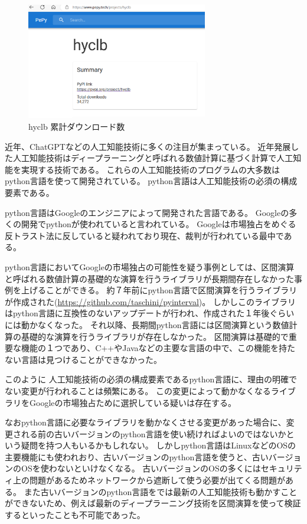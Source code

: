\documentclass[11pt,a4j,dvipdfmx]{jarticle} 					%
\newcommand{\研究課題名}{人工知能のためのLispシステム}
\newcommand{\研究機関名}{大阪公立大学工業高等専門学校}
\newcommand{\研究代表者氏名}{新妻弘崇}
\newcommand{\研究期間の最終元号年度}{11}  %
\begin{document}


\begin{figure}[htbp]
\begin{minipage}{0.5\hsize}
  \centering
  \includegraphics[width=7.9cm]{hyclb-ndown.eps}
  \caption{hyclb 累計ダウンロード数 }
  \label{fig:hyclb-ndown}
 \end{minipage}
\end{figure}


近年、ChatGPTなどの人工知能技術に多くの注目が集まっている。
近年発展した人工知能技術はディープラーニングと呼ばれる数値計算に基づく計算で人工知能を実現する技術である。
これらの人工知能技術のプログラムの大多数はpython言語を使って開発されている。
python言語は人工知能技術の必須の構成要素である。

python言語はGoogleのエンジニアによって開発された言語である。
Googleの多くの開発でpythonが使われていると言われている。
Googleは市場独占をめぐる反トラスト法に反していると疑われており現在、裁判が行われている最中である。

python言語においてGoogleの市場独占の可能性を疑う事例としては、区間演算と呼ばれる数値計算の基礎的な演算を行うライブラリが長期間存在しなかった事例を上げることができる。
約７年前にpython言語で区間演算を行うライブラリが作成された(\url{https://github.com/taschini/pyinterval})。
しかしこのライブラリはpython言語に互換性のないアップデートが行われ、作成された１年後ぐらいには動かなくなった。
それ以降、長期間python言語には区間演算という数値計算の基礎的な演算を行うライブラリが存在しなかった。
区間演算は基礎的で重要な機能の１つであり、C++やJavaなどの主要な言語の中で、この機能を持たない言語は見つけることができなかった。

このように
人工知能技術の必須の構成要素であるpython言語に、理由の明確でない変更が行われることは頻繁にある。
この変更によって動かなくなるライブラリをGoogleの市場独占ために選択している疑いは存在する。

なおpython言語に必要なライブラリを動かなくさせる変更があった場合に、変更される前の古いバージョンのpython言語を使い続ければよいのではないかという疑問を持つ人もいるかもしれない。
しかしpython言語はLinuxなどのOSの主要機能にも使われおり、古いバージョンのpython言語を使うと、古いバージョンのOSを使わないといけなくなる。
古いバージョンのOSの多くにはセキュリティ上の問題があるためネットワークから遮断して使う必要が出てくる問題がある。
また古いバージョンのpython言語をでは最新の人工知能技術も動かすことができないため、例えば最新のディープラーニング技術を区間演算を使って検証するといったことも不可能であった。
\end{document}
